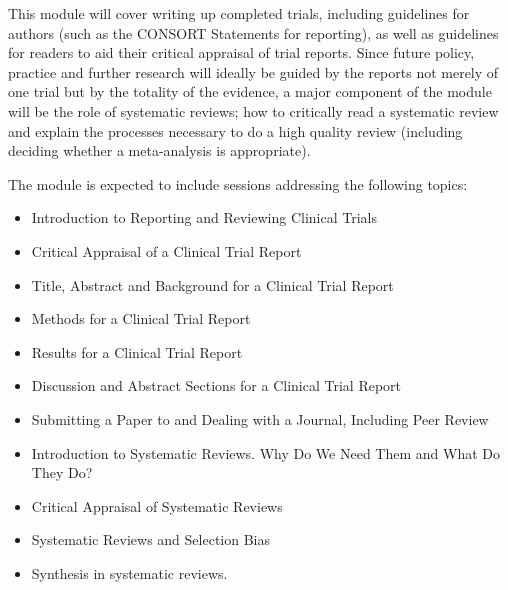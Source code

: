 
This module will cover writing up completed trials, including guidelines for
authors (such as the CONSORT Statements for reporting), as well as guidelines
for readers to aid their critical appraisal of trial reports. Since future policy,
practice and further research will ideally be guided by the reports not merely
of one trial but by the totality of the evidence, a major component of the
module will be the role of systematic reviews; how to critically read a
systematic review and explain the processes necessary to do a high quality
review (including deciding whether a meta-analysis is appropriate).

The module is expected to include sessions addressing the following topics:
\begin{itemize}
\item Introduction to Reporting and Reviewing Clinical Trials
\item Critical Appraisal of a Clinical Trial Report
\item Title, Abstract and Background for a Clinical Trial Report
\item Methods for a Clinical Trial Report
\item Results for a Clinical Trial Report
\item Discussion and Abstract Sections for a Clinical Trial Report
\item Submitting a Paper to and Dealing with a Journal, Including Peer Review
\item Introduction to Systematic Reviews. Why Do We Need Them and What Do
They Do?
\item Critical Appraisal of Systematic Reviews
\item Systematic Reviews and Selection Bias
\item Synthesis in systematic reviews.
\end{itemize}
